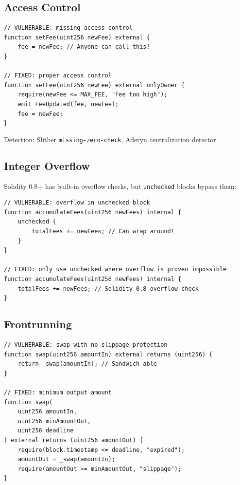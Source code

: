 \documentclass[11pt,a4paper]{article}
\begin{document}
\subsection{Access Control}

\begin{lstlisting}[language=Solidity,caption={Access control vulnerability and fix}]
// VULNERABLE: missing access control
function setFee(uint256 newFee) external {
    fee = newFee; // Anyone can call this!
}

// FIXED: proper access control
function setFee(uint256 newFee) external onlyOwner {
    require(newFee <= MAX_FEE, "fee too high");
    emit FeeUpdated(fee, newFee);
    fee = newFee;
}
\end{lstlisting}

Detection: Slither \texttt{missing-zero-check}, Aderyn centralization detector.

\subsection{Integer Overflow}

Solidity 0.8+ has built-in overflow checks, but \texttt{unchecked} blocks bypass them:

\begin{lstlisting}[language=Solidity,caption={Overflow in unchecked block}]
// VULNERABLE: overflow in unchecked block
function accumulateFees(uint256 newFees) internal {
    unchecked {
        totalFees += newFees; // Can wrap around!
    }
}

// FIXED: only use unchecked where overflow is proven impossible
function accumulateFees(uint256 newFees) internal {
    totalFees += newFees; // Solidity 0.8 overflow check
}
\end{lstlisting}

\subsection{Frontrunning}

\begin{lstlisting}[language=Solidity,caption={Frontrunning defense with commit-reveal}]
// VULNERABLE: swap with no slippage protection
function swap(uint256 amountIn) external returns (uint256) {
    return _swap(amountIn); // Sandwich-able
}

// FIXED: minimum output amount
function swap(
    uint256 amountIn,
    uint256 minAmountOut,
    uint256 deadline
) external returns (uint256 amountOut) {
    require(block.timestamp <= deadline, "expired");
    amountOut = _swap(amountIn);
    require(amountOut >= minAmountOut, "slippage");
}
\end{lstlisting}
\end{document}
